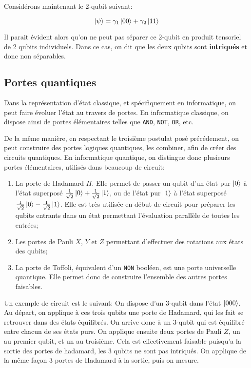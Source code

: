 \medbreak

Considérons maintenant le 2-qubit suivant:

\[
\ket{\psi} = \gamma_1 \ket{00} + \gamma_2 \ket{11}
\]

Il parait évident alors qu'on ne peut pas séparer ce 2-qubit en produit tensoriel de 2 qubits individuels. Dans ce cas, on dit que les deux qubits sont \textbf{intriqués} et donc non séparables.


\subsection{Portes quantiques}
Dans la représentation d'état classique, et spécifiquement en informatique, on peut faire évoluer l'état au travers de portes. En informatique classique, on dispose ainsi de portes élémentaires telles que \texttt{AND}, \texttt{NOT}, \texttt{OR}, etc. 

De la même manière, en respectant le troisième postulat posé précédement, on peut construire des portes logiques quantiques, les combiner, afin de créer des circuits quantiques. En informatique quantique, on distingue donc plusieurs portes élémentaires, utilisés dans beaucoup de circuit:

\begin{enumerate}
    \item La porte de Hadamard $H$. Elle permet de passer un qubit d'un état pur $\ket{0}$ à l'état superposé $\frac{1}{\sqrt{2}}\ket{0} + \frac{1}{\sqrt{2}}\ket{1}$, ou de l'état pur $\ket{1}$ à l'état superposé $\frac{1}{\sqrt{2}}\ket{0} - \frac{1}{\sqrt{2}}\ket{1}$. Elle est très utilisée en début de circuit pour préparer les qubits entrants dans un état permettant l'évaluation parallèle de toutes les entrées;
    \item Les portes de Pauli $X$, $Y$ et $Z$ permettant d'effectuer des rotations aux états des qubits;
    \item La porte de Toffoli, équivalent d'un \texttt{NON} booléen, est une porte universelle quantique. Elle permet donc de construire l'ensemble des autres portes faisables.
\end{enumerate}

Un exemple de circuit est le suivant: On dispose d'un 3-qubit dans l'état $\ket{000}$. Au départ, on applique à ces trois qubits une porte de Hadamard, qui les fait se retrouver dans des états équilibrés. On arrive donc à un 3-qubit qui est équilibré entre chacun de ses états purs. On applique ensuite deux portes de Pauli $Z$, un au premier qubit, et un au troisième. Cela est effectivement faisable puisqu'a la sortie des portes de hadamard, les 3 qubits ne sont pas intriqués. On applique de la même façon 3 portes de Hadamard à la sortie, puis on mesure. 

